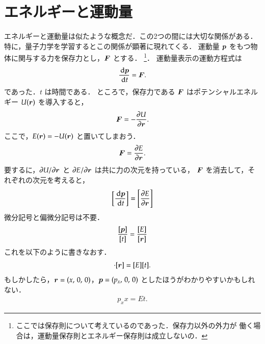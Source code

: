    \section{エネルギーと運動量}
        エネルギーと運動量は似たような概念だ．この2つの間には大切な関係がある．
        特に，量子力学を学習するとこの関係が顕著に現れてくる．
        運動量 $\boldsymbol{p}$ をもつ物体に関与する力を保存力とし，$\boldsymbol{F}$ とする．
                \footnote{
                        ここでは保存則について考えているのであった．保存力以外の外力が
                        働く場合は，運動量保存則とエネルギー保存則は成立しないの．
                }．
        運動量表示の運動方程式は
                        \begin{align*}
                        \frac{\,\mathrm{d} \boldsymbol{p}}{\,\mathrm{d} t} = \boldsymbol{F}.
                        \end{align*}
        であった．$t$ は時間である．
        ところで，保存力である $\boldsymbol{F}$ はポテンシャルエネルギー $U(\boldsymbol{r})$ を導入すると，
                        \begin{align*}
                        \boldsymbol{F} = -\frac{\partial U}{\partial \boldsymbol{r}}.
                        \end{align*}
        ここで，$E(\boldsymbol{r})=-U(\boldsymbol{r})$ と置いてしまおう．
                        \begin{align*}
                        \boldsymbol{F} = \frac{\partial E}{\partial \boldsymbol{r}}.
                        \end{align*}
                要するに，$\partial U/\partial \boldsymbol{r}$ と $\partial E/\partial \boldsymbol{r}$ は共に力の次元を持っている，
                $\boldsymbol{F}$ を消去して，それぞれの次元を考えると，
                        \begin{align*}
                        \left[\frac{\,\mathrm{d} \boldsymbol{p}}{\,\mathrm{d} t}\right] = \left[\frac{\partial E}{\partial \boldsymbol{r}}\right]
                        \end{align*}
                微分記号と偏微分記号は不要．
                        \begin{align*}
                        \frac{[\boldsymbol{p}]}{[t]} = \frac{[E]}{[\boldsymbol{r}]}
                        \end{align*}
                これを以下のように書きなおす．
                        \begin{align}
                                [\bp] \cdot [\br] = [E][t].
                        \end{align}
            もしかしたら，$\boldsymbol{r}=(x,\,0,\,0)$，$\boldsymbol{p}=({p}_{x},\,0,\,0)$ としたほうがわかりやすいかもしれない．
                        \begin{align*}
                                {p}_{x}x = Et.
                        \end{align*}

